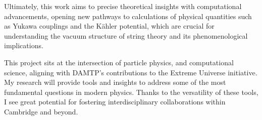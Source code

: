 \documentclass[11pt]{article}
\begin{document}
Ultimately, this work aims to precise theoretical insights with computational advancements, opening new pathways to calculations of physical quantities such as Yukawa couplings and the Kähler potential, which are crucial for understanding the vacuum structure of string theory and its phenomenological implications.

This project sits at the intersection of particle physics, and computational science, aligning with DAMTP's contributions to the Extreme Universe initiative. My research will provide tools and insights to address some of the most fundamental questions in modern physics. Thanks to the versatility of these tools, I see great potential for fostering interdisciplinary collaborations within Cambridge and beyond.
\end{document}
